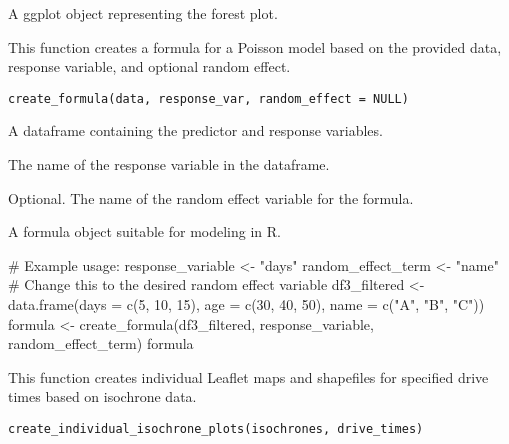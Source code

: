 \documentclass[a4paper]{book}
\begin{document}
%
\begin{Value}
A ggplot object representing the forest plot.
\end{Value}
%
\begin{Description}
This function creates a formula for a Poisson model based on the provided data,
response variable, and optional random effect.
\end{Description}
%
\begin{Usage}
\begin{verbatim}
create_formula(data, response_var, random_effect = NULL)
\end{verbatim}
\end{Usage}
%
\begin{Arguments}
\begin{ldescription}
\item[\code{data}] A dataframe containing the predictor and response variables.

\item[\code{response\_var}] The name of the response variable in the dataframe.

\item[\code{random\_effect}] Optional. The name of the random effect variable for the formula.
\end{ldescription}
\end{Arguments}
%
\begin{Value}
A formula object suitable for modeling in R.
\end{Value}
%
\begin{Examples}
\begin{ExampleCode}
# Example usage:
response_variable <- "days"
random_effect_term <- "name"  # Change this to the desired random effect variable
df3_filtered <- data.frame(days = c(5, 10, 15), age = c(30, 40, 50), name = c("A", "B", "C"))
formula <- create_formula(df3_filtered, response_variable, random_effect_term)
formula

\end{ExampleCode}
\end{Examples}
%
\begin{Description}
This function creates individual Leaflet maps and shapefiles for specified drive times
based on isochrone data.
\end{Description}
%
\begin{Usage}
\begin{verbatim}
create_individual_isochrone_plots(isochrones, drive_times)
\end{verbatim}
\end{Usage}
\end{document}
